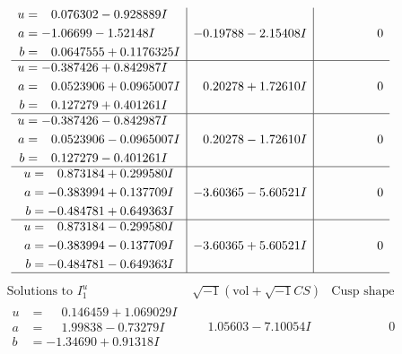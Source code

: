 \documentclass[1p]{elsarticle_modified}
\theoremstyle{definition}
\newcommand{\I}{\sqrt{-1}}
\begin{document}
$$\begin{array}{c|c|c}
\begin{aligned}
u &= \phantom{-}0.076302 - 0.928889 I \\
a &= -1.06699 - 1.52148 I \\
b &= \phantom{-}0.0647555 + 0.1176325 I\end{aligned}
 & -0.19788 - 2.15408 I & \phantom{-0.000000 } 0 \\ \hline\begin{aligned}
u &= -0.387426 + 0.842987 I \\
a &= \phantom{-}0.0523906 + 0.0965007 I \\
b &= \phantom{-}0.127279 + 0.401261 I\end{aligned}
 & \phantom{-}0.20278 + 1.72610 I & \phantom{-0.000000 } 0 \\ \hline\begin{aligned}
u &= -0.387426 - 0.842987 I \\
a &= \phantom{-}0.0523906 - 0.0965007 I \\
b &= \phantom{-}0.127279 - 0.401261 I\end{aligned}
 & \phantom{-}0.20278 - 1.72610 I & \phantom{-0.000000 } 0 \\ \hline\begin{aligned}
u &= \phantom{-}0.873184 + 0.299580 I \\
a &= -0.383994 + 0.137709 I \\
b &= -0.484781 + 0.649363 I\end{aligned}
 & -3.60365 - 5.60521 I & \phantom{-0.000000 } 0 \\ \hline\begin{aligned}
u &= \phantom{-}0.873184 - 0.299580 I \\
a &= -0.383994 - 0.137709 I \\
b &= -0.484781 - 0.649363 I\end{aligned}
 & -3.60365 + 5.60521 I & \phantom{-0.000000 } 0\\
 \hline 
 \end{array}$$\newpage$$\begin{array}{c|c|c}  
\text{Solutions to }I^u_{1}& \I (\text{vol} + \sqrt{-1}CS) & \text{Cusp shape}\\
 \hline 
\begin{aligned}
u &= \phantom{-}0.146459 + 1.069029 I \\
a &= \phantom{-}1.99838 - 0.73279 I \\
b &= -1.34690 + 0.91318 I\end{aligned}
 & \phantom{-}1.05603 - 7.10054 I & \phantom{-0.000000 } 0 \\ \hline\begin{aligned}

\end{aligned}
\end{array}$$
\end{document}
